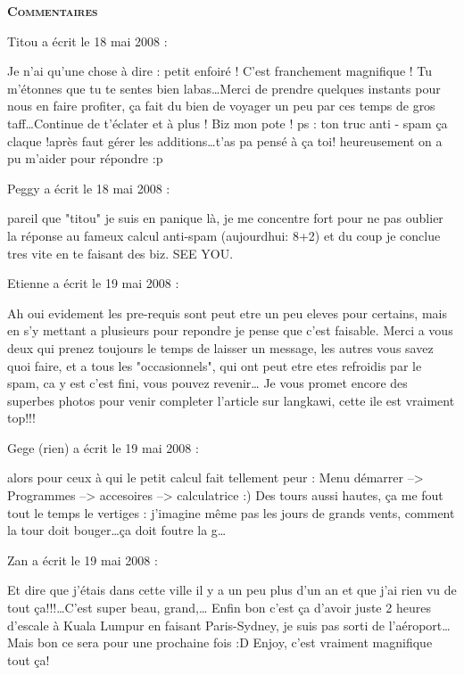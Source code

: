 \bigskip
\textbf{\textsc{Commentaires}}

\medskip
Titou a écrit le 18 mai 2008 :
\begin{displayquote}
Je n'ai qu'une chose à dire : petit enfoiré ! C'est franchement magnifique ! Tu m'étonnes que tu te sentes bien labas\dots Merci de prendre quelques instants pour nous en faire profiter, ça fait du bien de voyager un peu par ces temps de gros taff\dots Continue de t'éclater et à plus ! Biz mon pote !
ps : ton truc anti - spam ça claque !après faut gérer les additions\dots t'as pa pensé à ça toi! heureusement on a pu m'aider pour répondre :p
\end{displayquote}

\medskip
Peggy a écrit le 18 mai 2008 :
\begin{displayquote}
pareil que "titou" je suis en panique là, je me concentre fort pour ne pas oublier la réponse au fameux calcul anti-spam (aujourdhui: 8+2) et du coup je conclue tres vite en te faisant des biz.
SEE YOU.
\end{displayquote}

\medskip
Etienne a écrit le 19 mai 2008 :
\begin{displayquote}
Ah oui evidement les pre-requis sont peut etre un peu eleves pour certains, mais en s'y mettant a plusieurs pour repondre je pense que c'est faisable.
Merci a vous deux qui prenez toujours le temps de laisser un message, les autres vous savez quoi faire, et a tous les "occasionnels", qui ont peut etre etes refroidis par le spam, ca y est c'est fini, vous pouvez revenir\dots
Je vous promet encore des superbes photos pour venir completer l'article sur langkawi, cette ile est vraiment top!!!
\end{displayquote}

\medskip
Gege (rien) a écrit le 19 mai 2008 :
\begin{displayquote}
alors pour ceux à qui le petit calcul fait tellement peur : Menu démarrer --> Programmes --> accesoires --> calculatrice :)
Des tours aussi hautes, ça me fout tout le temps le vertiges : j'imagine même pas les jours de grands vents, comment la tour doit bouger\dots ça doit foutre la g\dots
\end{displayquote}

\medskip
Zan a écrit le 19 mai 2008 :
\begin{displayquote}
Et dire que j'étais dans cette ville il y a un peu plus d'un an et que j'ai rien vu de tout ça!!!\dots C'est super beau, grand,\dots
Enfin bon c'est ça d'avoir juste 2 heures d'escale à Kuala Lumpur en faisant Paris-Sydney, je suis pas sorti de l'aéroport\dots Mais bon ce sera pour une prochaine fois :D
Enjoy, c'est vraiment magnifique tout ça!
\end{displayquote}

\vfill

